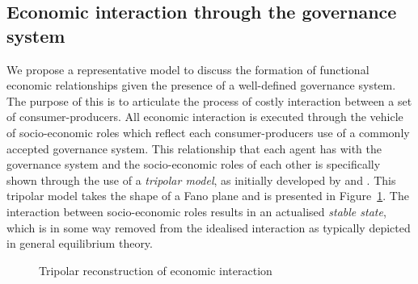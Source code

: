 \subsection{Economic interaction through the governance system} 
\label{interactionGovernanceSystem}

We propose a representative model to discuss the formation of functional economic relationships given the presence of a well-defined governance system. The purpose of this is to articulate the process of costly interaction between a set of consumer-producers. All economic interaction is executed through the vehicle of socio-economic roles which reflect each consumer-producers use of a commonly accepted governance system. This relationship that each agent has with the governance system and the socio-economic roles of each other is specifically shown through the use of a \textit{tripolar model}, as initially developed by \citet{Ruys1981} and \citet{Gilles1990}. This tripolar model takes the shape of a Fano plane and is presented in Figure~\ref{fig:governance}. The interaction between socio-economic roles results in an actualised \emph{stable state}, which is in some way removed from the idealised interaction as typically depicted in general equilibrium theory.

\begin{figure}[t]
\begin{center}
\end{center}
\caption[Tripolar reconstruction of economic interaction]{Tripolar reconstruction of economic interaction}
\label{fig:governance}
\end{figure}

